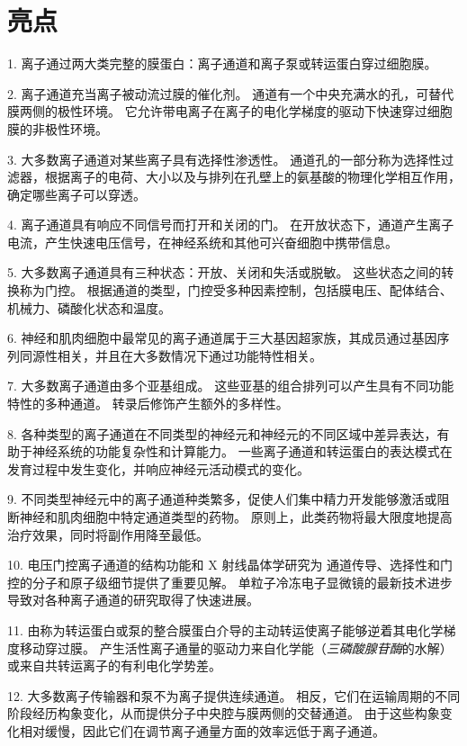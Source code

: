 \section{亮点}


1. 离子通过两大类完整的膜蛋白：离子通道和离子泵或转运蛋白穿过细胞膜。


2. 离子通道充当离子被动流过膜的催化剂。
通道有一个中央充满水的孔，可替代膜两侧的极性环境。 
它允许带电离子在离子的电化学梯度的驱动下快速穿过细胞膜的非极性环境。


3. 大多数离子通道对某些离子具有选择性渗透性。
通道孔的一部分称为选择性过滤器，根据离子的电荷、大小以及与排列在孔壁上的氨基酸的物理化学相互作用，确定哪些离子可以穿透。


4. 离子通道具有响应不同信号而打开和关闭的门。
在开放状态下，通道产生离子电流，产生快速电压信号，在神经系统和其他可兴奋细胞中携带信息。


5. 大多数离子通道具有三种状态：开放、关闭和失活或脱敏。
这些状态之间的转换称为门控。
根据通道的类型，门控受多种因素控制，包括膜电压、配体结合、机械力、磷酸化状态和温度。


6. 神经和肌肉细胞中最常见的离子通道属于三大基因超家族，其成员通过基因序列同源性相关，并且在大多数情况下通过功能特性相关。


7. 大多数离子通道由多个亚基组成。
这些亚基的组合排列可以产生具有不同功能特性的多种通道。 转录后修饰产生额外的多样性。


8. 各种类型的离子通道在不同类型的神经元和神经元的不同区域中差异表达，有助于神经系统的功能复杂性和计算能力。
一些离子通道和转运蛋白的表达模式在发育过程中发生变化，并响应神经元活动模式的变化。


9. 不同类型神经元中的离子通道种类繁多，促使人们集中精力开发能够激活或阻断神经和肌肉细胞中特定通道类型的药物。
原则上，此类药物将最大限度地提高治疗效果，同时将副作用降至最低。


10. 电压门控离子通道的结构功能和 X 射线晶体学研究为  通道传导、选择性和门控的分子和原子级细节提供了重要见解。
单粒子冷冻电子显微镜的最新技术进步导致对各种离子通道的研究取得了快速进展。


11. 由称为转运蛋白或泵的整合膜蛋白介导的主动转运使离子能够逆着其电化学梯度移动穿过膜。
产生活性离子通量的驱动力来自化学能（\textit{三磷酸腺苷酶}的水解）或来自共转运离子的有利电化学势差。


12. 大多数离子传输器和泵不为离子提供连续通道。
相反，它们在运输周期的不同阶段经历构象变化，从而提供分子中央腔与膜两侧的交替通道。
由于这些构象变化相对缓慢，因此它们在调节离子通量方面的效率远低于离子通道。



